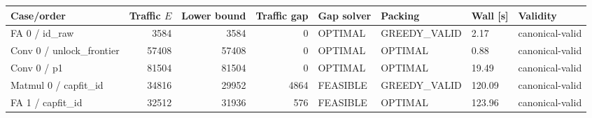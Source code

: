 \begin{tabular}{lrrrllll}
\toprule
Case/order & Traffic $E$ & Lower bound & Traffic gap & Gap solver & Packing & Wall [s] & Validity \\
\midrule
FA 0 / id_raw & 3584 & 3584 & 0 & OPTIMAL & GREEDY_VALID & 2.17 & canonical-valid \\
Conv 0 / unlock_frontier & 57408 & 57408 & 0 & OPTIMAL & OPTIMAL & 0.88 & canonical-valid \\
Conv 0 / p1 & 81504 & 81504 & 0 & OPTIMAL & OPTIMAL & 19.49 & canonical-valid \\
Matmul 0 / capfit_id & 34816 & 29952 & 4864 & FEASIBLE & GREEDY_VALID & 120.09 & canonical-valid \\
FA 1 / capfit_id & 32512 & 31936 & 576 & FEASIBLE & OPTIMAL & 123.96 & canonical-valid \\
\bottomrule
\end{tabular}

